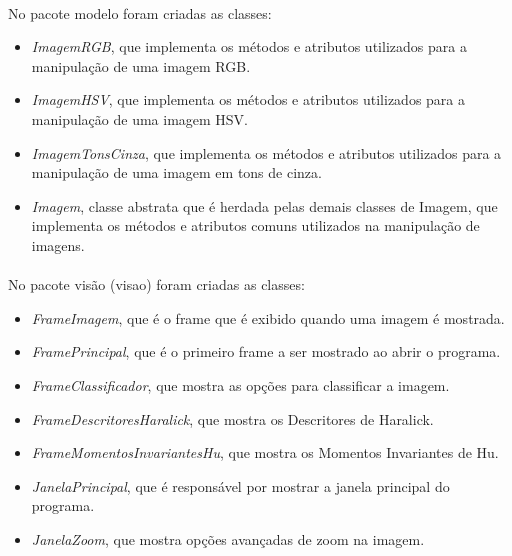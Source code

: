 \documentclass[12pt]{article}
\begin{document}
\paragraph{}No pacote modelo foram criadas as classes:

\begin{itemize}
    \item \textit{ImagemRGB}, que implementa os métodos e atributos utilizados para a manipulação de uma imagem RGB.
    
    \item \textit{ImagemHSV}, que implementa os métodos e atributos utilizados para a manipulação de uma imagem HSV.
    
    \item \textit{ImagemTonsCinza}, que implementa os métodos e atributos utilizados para a manipulação de uma imagem em tons de cinza.
    
    \item \textit{Imagem}, classe abstrata que é herdada pelas demais classes de Imagem, que implementa os métodos e atributos comuns utilizados na manipulação de imagens.
\end{itemize}

\paragraph{}No pacote visão (visao) foram criadas as classes:

\begin{itemize}
    \item \textit{FrameImagem}, que é o frame que é exibido quando uma imagem é mostrada.

    \item \textit{FramePrincipal}, que é o primeiro frame a ser mostrado ao abrir o programa.
    
    \item \textit{FrameClassificador}, que mostra as opções para classificar a imagem.
    
    \item \textit{FrameDescritoresHaralick}, que mostra os Descritores de Haralick.

    \item \textit{FrameMomentosInvariantesHu}, que mostra os Momentos Invariantes de Hu.

    \item \textit{JanelaPrincipal}, que é responsável por mostrar a janela principal do programa.
    
    \item \textit{JanelaZoom}, que mostra opções avançadas de zoom na imagem.
\end{itemize}
\end{document}
